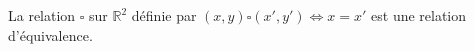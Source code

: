 La relation $\square$ sur $\mathbb R^2$ définie par $(x,y)\square (x',y') \iff x=x'$ est une relation d'équivalence.

\begin{reponses}
\end{reponses}

